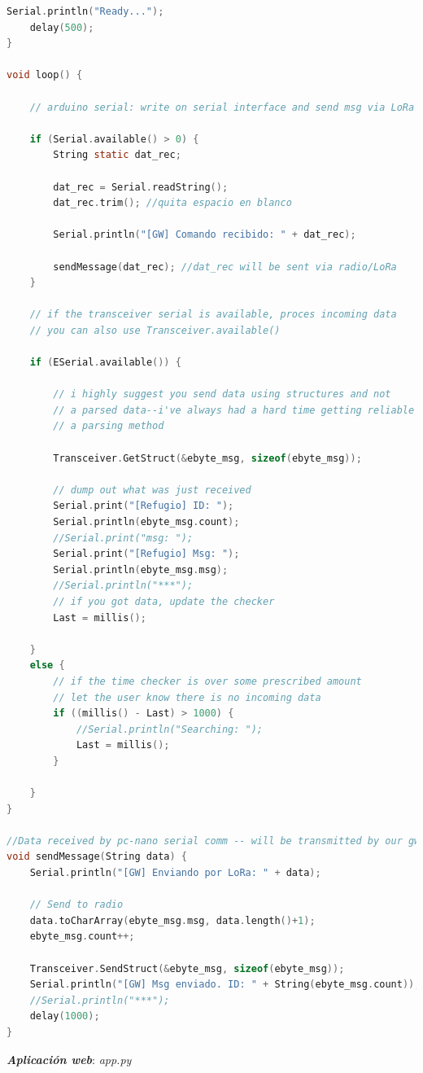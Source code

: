 \documentclass[12pt]{article}
\begin{document}
\begin{lstlisting}[language=C]
	Serial.println("Ready...");
	delay(500);
}

void loop() {
	
	// arduino serial: write on serial interface and send msg via LoRa to refugio station
	
	if (Serial.available() > 0) {
		String static dat_rec;
		
		dat_rec = Serial.readString();
		dat_rec.trim(); //quita espacio en blanco
		
		Serial.println("[GW] Comando recibido: " + dat_rec);
		
		sendMessage(dat_rec); //dat_rec will be sent via radio/LoRa
	}
	
	// if the transceiver serial is available, proces incoming data
	// you can also use Transceiver.available()
	
	if (ESerial.available()) {
		
		// i highly suggest you send data using structures and not
		// a parsed data--i've always had a hard time getting reliable data using
		// a parsing method
		
		Transceiver.GetStruct(&ebyte_msg, sizeof(ebyte_msg));
		
		// dump out what was just received
		Serial.print("[Refugio] ID: "); 
		Serial.println(ebyte_msg.count);
		//Serial.print("msg: "); 
		Serial.print("[Refugio] Msg: ");
		Serial.println(ebyte_msg.msg);
		//Serial.println("***");
		// if you got data, update the checker
		Last = millis();
		
	}
	else {
		// if the time checker is over some prescribed amount
		// let the user know there is no incoming data
		if ((millis() - Last) > 1000) {
			//Serial.println("Searching: ");
			Last = millis();
		}
		
	}
}

//Data received by pc-nano serial comm -- will be transmitted by our gw LoRa transceiver
void sendMessage(String data) {
	Serial.println("[GW] Enviando por LoRa: " + data);
	
	// Send to radio
	data.toCharArray(ebyte_msg.msg, data.length()+1);
	ebyte_msg.count++; 
	
	Transceiver.SendStruct(&ebyte_msg, sizeof(ebyte_msg));
	Serial.println("[GW] Msg enviado. ID: " + String(ebyte_msg.count));
	//Serial.println("***");
	delay(1000);
}
	\end{lstlisting}

	\noindent \textit{\textbf{Aplicación web}}: \textit{app.py}\\
\end{document}
